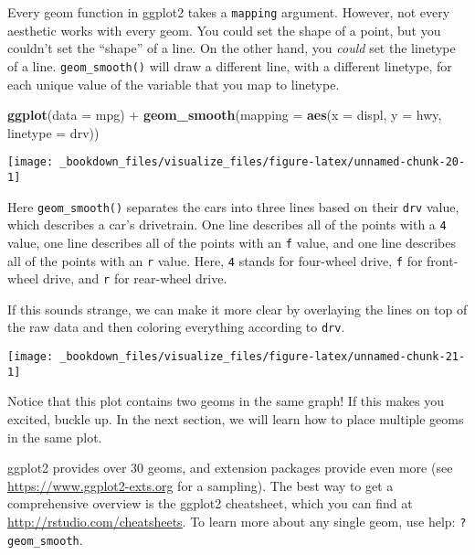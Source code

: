 \documentclass[]{book}
\newenvironment{Shaded}{\begin{snugshade}}{\end{snugshade}}
\newcommand{\KeywordTok}[1]{\textcolor[rgb]{0.13,0.29,0.53}{\textbf{{#1}}}}
\newcommand{\DataTypeTok}[1]{\textcolor[rgb]{0.13,0.29,0.53}{{#1}}}
\newcommand{\StringTok}[1]{\textcolor[rgb]{0.31,0.60,0.02}{{#1}}}
\newcommand{\NormalTok}[1]{{#1}}
\begin{document}
Every geom function in ggplot2 takes a \texttt{mapping} argument.
However, not every aesthetic works with every geom. You could set the
shape of a point, but you couldn't set the ``shape'' of a line. On the
other hand, you \emph{could} set the linetype of a line.
\texttt{geom\_smooth()} will draw a different line, with a different
linetype, for each unique value of the variable that you map to
linetype.

\begin{Shaded}
\begin{Highlighting}[]
\KeywordTok{ggplot}\NormalTok{(}\DataTypeTok{data =} \NormalTok{mpg) +}\StringTok{ }
\StringTok{  }\KeywordTok{geom_smooth}\NormalTok{(}\DataTypeTok{mapping =} \KeywordTok{aes}\NormalTok{(}\DataTypeTok{x =} \NormalTok{displ, }\DataTypeTok{y =} \NormalTok{hwy, }\DataTypeTok{linetype =} \NormalTok{drv))}
\end{Highlighting}
\end{Shaded}

\begin{center}\texttt{[image: \_bookdown\_files/visualize\_files/figure-latex/unnamed-chunk-20-1]} \end{center}

Here \texttt{geom\_smooth()} separates the cars into three lines based
on their \texttt{drv} value, which describes a car's drivetrain. One
line describes all of the points with a \texttt{4} value, one line
describes all of the points with an \texttt{f} value, and one line
describes all of the points with an \texttt{r} value. Here, \texttt{4}
stands for four-wheel drive, \texttt{f} for front-wheel drive, and
\texttt{r} for rear-wheel drive.

If this sounds strange, we can make it more clear by overlaying the
lines on top of the raw data and then coloring everything according to
\texttt{drv}.

\begin{center}\texttt{[image: \_bookdown\_files/visualize\_files/figure-latex/unnamed-chunk-21-1]} \end{center}

Notice that this plot contains two geoms in the same graph! If this
makes you excited, buckle up. In the next section, we will learn how to
place multiple geoms in the same plot.

ggplot2 provides over 30 geoms, and extension packages provide even more
(see \url{https://www.ggplot2-exts.org} for a sampling). The best way to
get a comprehensive overview is the ggplot2 cheatsheet, which you can
find at \url{http://rstudio.com/cheatsheets}. To learn more about any
single geom, use help: \texttt{?geom\_smooth}.
\end{document}
